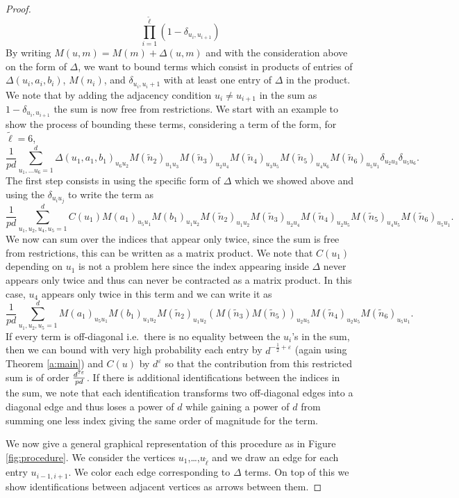 \documentclass[letterpaper, 10pt, dvipsnames]{article}
\numberwithin{equation}{section}
\renewcommand{\tilde}{\widetilde}
\let\O\relax
\newcommand{\O}[1]{\mathcal{O}\left(#1\right)}
\newcommand{\nt}{\tilde{n}}
\theoremstyle{definition}
\begin{document}
\begin{proof}
\[    \prod_{i=1}^{\tilde{\ell}}(1-\delta_{u_{i},u_{i+1}})
  \]
  By writing $M(u,m) = M(m)+\Delta(u,m)$ and with the consideration above on the form of $\Delta$, we want to bound terms which consist in products of entries of $\Delta(u_i,a_i,b_i)$, $M(n_i)$, and $\delta_{u_i,u_i+1}$ with at least one entry of $\Delta$ in the product. We note that by adding the adjacency condition $u_i\neq u_{i+1}$ in the sum as $1-\delta_{u_i,u_{i+1}}$ the sum is now free from restrictions. We start with an example to show the process of bounding these terms, considering a term of the form, for $\tilde{\ell}=6$, 
  \[
  \frac{1}{pd}\sum_{u_1,\dots u_6=1}^d\Delta(u_1,a_1,b_1)_{u_6u_2}M(\tilde{n}_2)_{u_1u_3}M(\tilde{n}_3)_{u_2u_4}M(\nt_4)_{u_3u_5}M(\nt_5)_{u_4u_6}M(\nt_6)_{u_5u_1}\delta_{u_2u_3}\delta_{u_5u_6}.
  \]
The first step consists in using the specific form of $\Delta$ which we showed above and using the $\delta_{u_iu_j}$ to write the term as 
\[
\frac{1}{pd}\sum_{u_1,u_2,u_4,u_5=1}^dC(u_1)M(a_1)_{u_5u_1}M(b_1)_{u_1u_2}M(\tilde{n}_2)_{u_1u_2}M(\tilde{n}_3)_{u_2u_4}M(\nt_4)_{u_2u_5}M(\nt_5)_{u_4u_5}M(\nt_6)_{u_5u_1}.
\]
We now can sum over the indices that appear only twice, since the sum is free from restrictions, this can be written as a matrix product. We note that $C(u_1)$ depending on $u_1$ is not a problem here since the index appearing inside $\Delta$ never appears only twice and thus can never be contracted as a matrix product. In this case, $u_4$ appears only twice in this term and we can write it as 
\[
\frac{1}{pd}\sum_{u_1,u_2,u_5=1}^dM(a_1)_{u_5u_1}M(b_1)_{u_1u_2}M(\tilde{n}_2)_{u_1u_2}
\left(
  M(\tilde{n}_3)M(\nt_5)
\right)_{u_2u_5}
M(\nt_4)_{u_2u_5}M(\nt_6)_{u_5u_1}.
\]
If every term is off-diagonal i.e.\ there is no equality between the $u_i$'s in the sum, then we can bound with very high probability each entry by $d^{-\frac{1}{2}+\varepsilon}$ (again using Theorem \ref{a:main}) and $C(u)$ by $d^\varepsilon$ so that the contribution from this restricted sum is of order $\O{\frac{d^{7\varepsilon}}{pd}}$. If there is additional identifications between the indices in the sum, we note that each identification transforms two off-diagonal edges into a diagonal edge and thus loses a power of $d$ while gaining a power of $d$ from summing one less index giving the same order of magnitude for the term.

We now give a general graphical representation of this procedure as in Figure \ref{fig:procedure}. We consider the vertices $u_1$,\dots,$u_{\tilde{\ell}}$ and we draw an edge for each entry $u_{i-1,i+1}$. We color each edge corresponding to $\Delta$ terms. On top of this we show identifications between adjacent vertices as arrows between them.


\end{proof}
\end{document}
